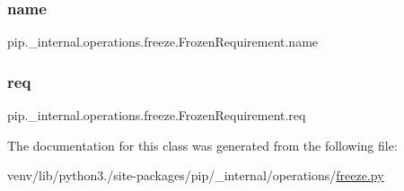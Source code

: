 \subsubsection{\texorpdfstring{name}{name}}
{\footnotesize\ttfamily pip.\+\_\+internal.\+operations.\+freeze.\+Frozen\+Requirement.\+name}

\mbox{\label{classpip_1_1__internal_1_1operations_1_1freeze_1_1FrozenRequirement_a1d9481e3ef55293de239f628e482f9a1}} 
\subsubsection{\texorpdfstring{req}{req}}
{\footnotesize\ttfamily pip.\+\_\+internal.\+operations.\+freeze.\+Frozen\+Requirement.\+req}



The documentation for this class was generated from the following file\+:\begin{DoxyCompactItemize}
\item 
venv/lib/python3./site-\/packages/pip/\+\_\+internal/operations/\hyperlink{operations_2freeze_8py}{freeze.\+py}\end{DoxyCompactItemize}
